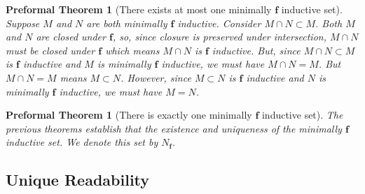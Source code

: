 \documentclass[oneside, 12pt]{book}
\theoremstyle{break}
\newtheorem{preformal definition}[definition]{Preformal Definition}
\newtheorem{preformal theorem}[theorem]{Preformal Theorem}
\newcommand{\bv}[1]{\boldsymbol{#1}}
\begin{document}
				\begin{preformal theorem}[There exists at most one minimally $\bv{f}$ inductive set]
					\label{minimally inductive set is unique}
					Suppose $M$ and $N$ are both minimally $\bv{f}$ inductive.
					Consider $M\cap N \subset M$.
					Both $M$ and $N$ are closed under $\bv{f}$, so, since closure is preserved under intersection, $M \cap N$ must be closed under $\bv{f}$ which means $M \cap N$ is $\bv{f}$ inductive.
					But, since $M \cap N\subset M$ is $\bv{f}$ inductive and $M$ is minimally $\bv{f}$ inductive, we must have $M\cap N = M$.
					But $M\cap N = M$ means $M \subset N$.
					However, since $M\subset N$ is $\bv{f}$ inductive and $N$ is minimally $\bv{f}$ inductive, we must have $M = N$.
				\end{preformal theorem}
				
				\begin{preformal theorem}[There is exactly one minimally $\bv{f}$ inductive set]
					\label{exactly one minimally inductive set}
					The previous theorems establish that the existence and uniqueness of the minimally $\bv{f}$ inductive set.
					We denote this set by $N_{\bv{f}}$.
				\end{preformal theorem}
					
			\subsection{Unique Readability}
				
\end{document}
